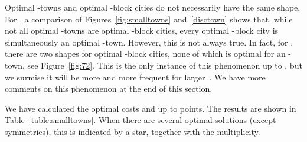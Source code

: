 \documentclass[preprint,authoryear,12pt]{elsarticle}
\begin{document}
Optimal -towns and optimal -block cities do not necessarily
have the same shape. For , a comparison of
Figures~\ref{fig:smalltowns} and~\ref{disctown} shows that, while
not all optimal -towns are optimal -block cities, every
optimal -block city is simultaneously an optimal -town.
However, this is not always true. In fact, for , there are two shapes for
 optimal -block cities, none of which is optimal for an -town,
see Figure~\ref{fig:72}.
This is the only instance of this phenomenon up to , but we
surmise it will be more and more frequent for larger~.
We have more comments on this phenomenon at the end of this section.


We have calculated the optimal costs
 and
 up to  points. The results are shown in
Table~\ref{table:smalltowns}. When there are several optimal solutions
(except symmetries), this is indicated by a star,
together with the multiplicity.
\end{document}
